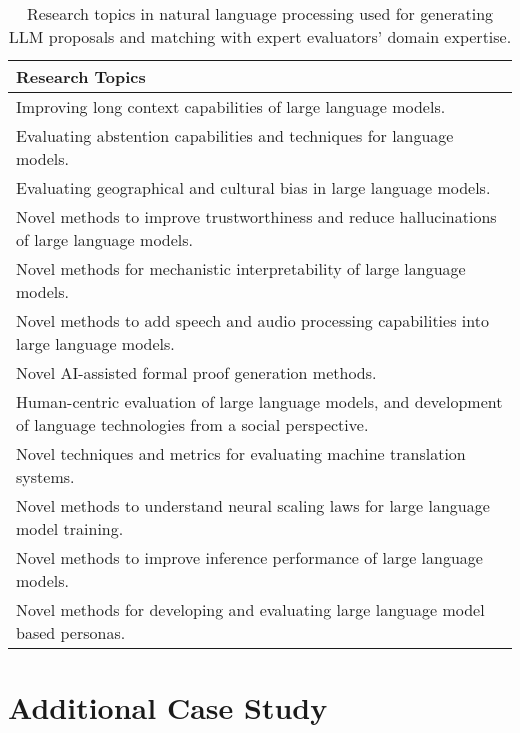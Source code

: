 
\begin{table*}[t]
    \centering
    \small
    \renewcommand{\arraystretch}{1.4}  %
    \begin{tabular}{>{\raggedright\arraybackslash}p{}}
        \toprule
        \textbf{Research Topics} \\
        \midrule
        Improving long context capabilities of large language models. \\[1ex]
        Evaluating abstention capabilities and techniques for language models. \\[1ex]
        Evaluating geographical and cultural bias in large language models. \\[1ex]
        Novel methods to improve trustworthiness and reduce hallucinations of large language models. \\[1ex]
        Novel methods for mechanistic interpretability of large language models. \\[1ex]
        Novel methods to add speech and audio processing capabilities into large language models. \\[1ex]
        Novel AI-assisted formal proof generation methods. \\[1ex]
        Human-centric evaluation of large language models, and development of language technologies from a social perspective. \\[1ex]
        Novel techniques and metrics for evaluating machine translation systems. \\[1ex]
        Novel methods to understand neural scaling laws for large language model training. \\[1ex]
        Novel methods to improve inference performance of large language models. \\[1ex]
        Novel methods for developing and evaluating large language model based personas. \\
        \bottomrule
    \end{tabular}
    \caption{Research topics in natural language processing used for generating LLM proposals and matching with expert evaluators' domain expertise.}
    \label{tab:research-topics}
\end{table*}

\section{Additional Case Study}\label{appendix:additional-case}

